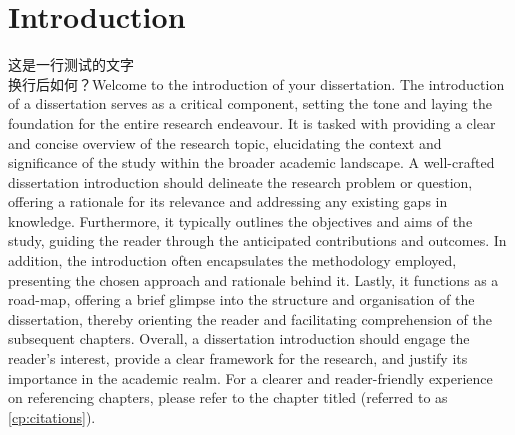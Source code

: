 \chapter{Introduction}
\label{cp:introduction}
这是一行测试的文字\\换行后如何？Welcome to the introduction of your dissertation. The introduction of a dissertation serves as a critical component, setting the tone and laying the foundation for the entire research endeavour. It is tasked with providing a clear and concise overview of the research topic, elucidating the context and significance of the study within the broader academic landscape. A well-crafted dissertation introduction should delineate the research problem or question, offering a rationale for its relevance and addressing any existing gaps in knowledge. Furthermore, it typically outlines the objectives and aims of the study, guiding the reader through the anticipated contributions and outcomes. In addition, the introduction often encapsulates the methodology employed, presenting the chosen approach and rationale behind it. Lastly, it functions as a road-map, offering a brief glimpse into the structure and organisation of the dissertation, thereby orienting the reader and facilitating comprehension of the subsequent chapters. Overall, a dissertation introduction should engage the reader's interest, provide a clear framework for the research, and justify its importance in the academic realm. For a clearer and reader-friendly experience on referencing chapters, please refer to the chapter titled  (referred to as \autoref{cp:citations}).